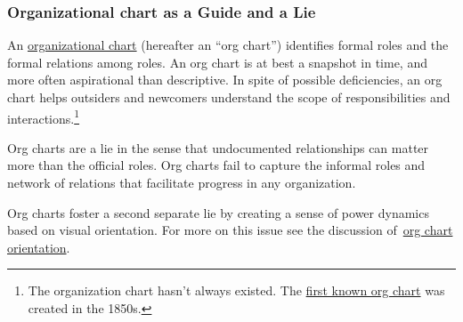 \subsubsection*{Organizational chart as a Guide and a Lie}

An \href{https://en.wikipedia.org/wiki/Organizational_chart}{organizational chart} (hereafter an ``org chart'') identifies formal roles and the formal relations among roles. An org chart is at best a snapshot in time, and more often aspirational than descriptive. In spite of possible deficiencies, an org chart helps outsiders and newcomers understand the scope of responsibilities and interactions.\footnote{The organization chart hasn't always existed. The \href{https://en.wikipedia.org/wiki/George_Holt_Henshaw\#First_organization_chart}{first known org chart} was created in the 1850s.}

Org charts are a lie in the sense that undocumented relationships can matter more than the official roles. Org charts fail to capture the informal roles and network of relations that facilitate progress in any organization. 

Org charts foster a second separate lie by creating a sense of power dynamics based on visual orientation. For more on this issue see the discussion of~\hyperref[org-chart-orientation]{org chart orientation}.
